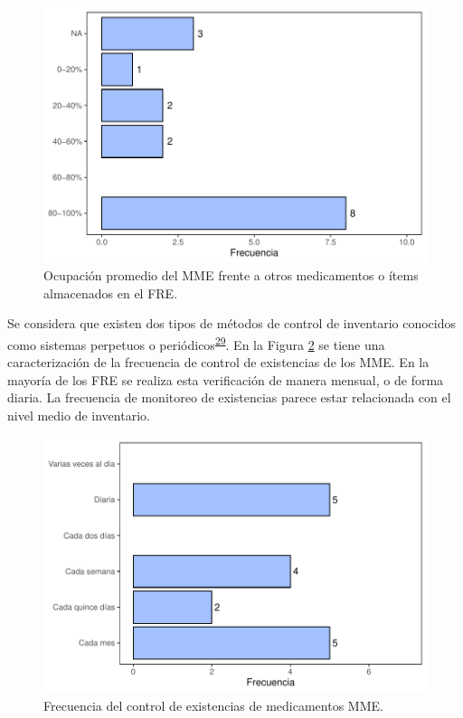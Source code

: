 \documentclass[
]{book}
\begin{document}
\begin{figure}[!b]

{\centering \includegraphics[width=0.85\linewidth]{InformeFinal_files/figure-latex/PropOcupacionAlmacen-1} 

}

\caption{Ocupación promedio del MME frente a otros medicamentos o ítems almacenados en el FRE.}\label{fig:PropOcupacionAlmacen}
\end{figure}

Se considera que existen dos tipos de métodos de control de inventario conocidos como sistemas perpetuos o periódicos\textsuperscript{\protect\hyperlink{ref-Silver2017}{29}}.
En la Figura \ref{fig:FrecControlExistencias} se tiene una caracterización de la frecuencia de control de existencias de los MME. En la mayoría de los FRE se realiza esta verificación de manera mensual, o de forma diaria. La frecuencia de monitoreo de existencias parece estar relacionada con el nivel medio de inventario.

\begin{figure}

{\centering \includegraphics[width=1\linewidth]{InformeFinal_files/figure-latex/FrecControlExistencias-1} 

}

\caption{Frecuencia del control de existencias de medicamentos MME.}\label{fig:FrecControlExistencias}
\end{figure}
\end{document}
